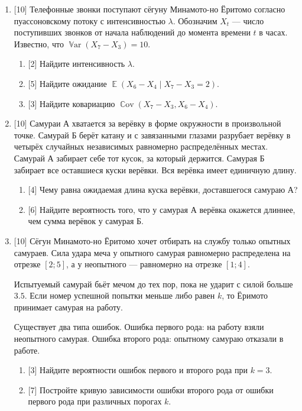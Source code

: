 \documentclass[12pt]{article}
\DeclareMathOperator{\Cov}{\mathbb{C}ov}
\DeclareMathOperator{\Var}{\mathbb{V}ar}
\DeclareMathOperator{\E}{\mathbb{E}}
\begin{document}
\begin{enumerate}
    \item {[10]} Телефонные звонки поступают сёгуну Минамото-но Ёритомо согласно пуассоновскому потоку с интенсивностью $\lambda$. 
    Обозначим $X_t$ ­— число поступивших звонков от начала наблюдений до момента времени $t$ в часах.
    Известно, что $\Var(X_7 - X_3) = 10$.
    \begin{enumerate}
        \item {[2]} Найдите интенсивность $\lambda$. 
        \item {[5]} Найдите ожидание $\E(X_6 - X_4 \mid X_7 - X_3 = 2)$.
        \item {[3]} Найдите ковариацию $\Cov(X_7 - X_3, X_6 - X_4)$.
    \end{enumerate}
      
    \item {[10]} Самураи А хватается за верёвку в форме окружности в произвольной точке.
    Самурай Б берёт катану и с завязанными глазами разрубает верёвку в четырёх случайных независимых равномерно распределённых местах. 
    Самурай А забирает себе тот кусок, за который держится. 
    Самурая Б забирает все оставшиеся куски верёвки. 
    Вся верёвка имеет единичную длину.
      \begin{enumerate}
      \item {[4]} Чему равна ожидаемая длина куска верёвки, доставшегося самураю А?
      \item {[6]} Найдите вероятность того, что у самурая А верёвка окажется длиннее, чем сумма верёвок у самурая Б.
    \end{enumerate}
    
    \item {[10]} Сёгун Минамото-но Ёритомо хочет отбирать на службу только опытных самураев. 
    Сила удара меча у опытного самурая равномерно распределена на отрезке $[2; 5]$,
    а у неопытного — равномерно на отрезке $[1; 4]$.

    Испытуемый самурай бьёт мечом до тех пор, пока не ударит с силой больше $3.5$. 
    Если номер успешной попытки меньше либо равен $k$, то Ёримото принимает самурая на работу.

    Существует два типа ошибок. 
    Ошибка первого рода: на работу взяли неопытного самурая. 
    Ошибка второго рода: опытному самураю отказали в работе. 

    \begin{enumerate}
        \item {[3]} Найдите вероятности ошибок первого и второго рода при $k = 3$.
        \item {[7]} Постройте кривую зависимости ошибки второго рода от ошибки первого рода при различных порогах $k$.
    \end{enumerate}


\end{enumerate}
    
\end{document}
